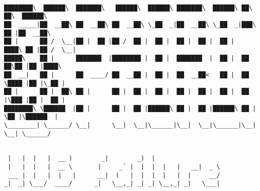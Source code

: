 \documentclass[varwidth=\maxdimen,margin=0.5cm,multi={verbatim}]{standalone}
\begin{document}
\begin{verbatim}

████████\  ██████\  ███████\   ██████\  ██████\ ███████\  ██████\ ██\   ██\  ██████\
██  _____|██  __██\ ██  __██\ ██  __██\ \_██  _|██  __██\ \_██  _|███\  ██ |██  __██\
██ |      ██ /  \__|██ |  ██ |██ /  ██ |  ██ |  ██ |  ██ |  ██ |  ████\ ██ |██ /  \__|
█████\    ██ |      ███████  |████████ |  ██ |  ███████  |  ██ |  ██ ██\██ |██ |████\
██  __|   ██ |      ██  ____/ ██  __██ |  ██ |  ██  __██<   ██ |  ██ \████ |██ |\_██ |
██ |      ██ |  ██\ ██ |      ██ |  ██ |  ██ |  ██ |  ██ |  ██ |  ██ |\███ |██ |  ██ |
████████\ \██████  |██ |      ██ |  ██ |██████\ ██ |  ██ |██████\ ██ | \██ |\██████  |
\________| \______/ \__|      \__|  \__|\______|\__|  \__|\______|\__|  \__| \______/
               
               
 |   |  |   |  __ )        _|        _)  |
 |   |  |   |  __ \       |     _` |  |  |  |   |   __|  _ \
 ___ |  |   |  |   |      __|  (   |  |  |  |   |  |     __/
_|  _| \___/  ____/      _|   \__,_| _| _| \__,_| _|   \___|



\end{verbatim}
\end{document}
